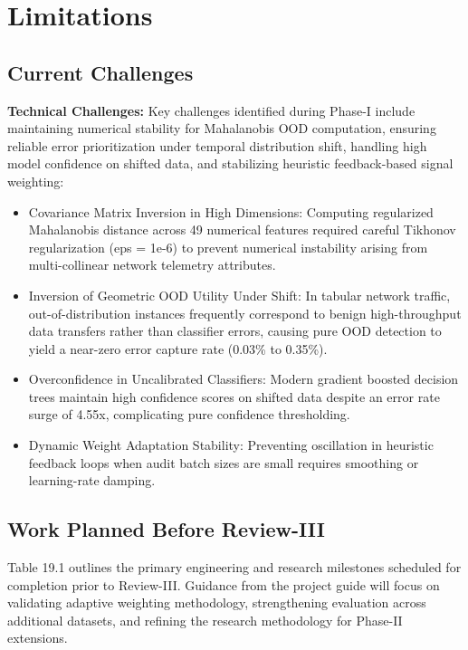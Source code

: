 \chapter{Limitations}

\section{Current Challenges}

\textbf{Technical Challenges:} Key challenges identified during Phase-I include maintaining numerical stability for Mahalanobis OOD computation, ensuring reliable error prioritization under temporal distribution shift, handling high model confidence on shifted data, and stabilizing heuristic feedback-based signal weighting:

\begin{itemize}
\item Covariance Matrix Inversion in High Dimensions: Computing regularized Mahalanobis distance across 49 numerical features required careful Tikhonov regularization (eps = 1e-6) to prevent numerical instability arising from multi-collinear network telemetry attributes.
\item Inversion of Geometric OOD Utility Under Shift: In tabular network traffic, out-of-distribution instances frequently correspond to benign high-throughput data transfers rather than classifier errors, causing pure OOD detection to yield a near-zero error capture rate (0.03\% to 0.35\%).
\item Overconfidence in Uncalibrated Classifiers: Modern gradient boosted decision trees maintain high confidence scores on shifted data despite an error rate surge of 4.55x, complicating pure confidence thresholding.
\item Dynamic Weight Adaptation Stability: Preventing oscillation in heuristic feedback loops when audit batch sizes are small requires smoothing or learning-rate damping.
\end{itemize}

\section{Work Planned Before Review-III}

Table 19.1 outlines the primary engineering and research milestones scheduled for completion prior to Review-III. Guidance from the project guide will focus on validating adaptive weighting methodology, strengthening evaluation across additional datasets, and refining the research methodology for Phase-II extensions.

